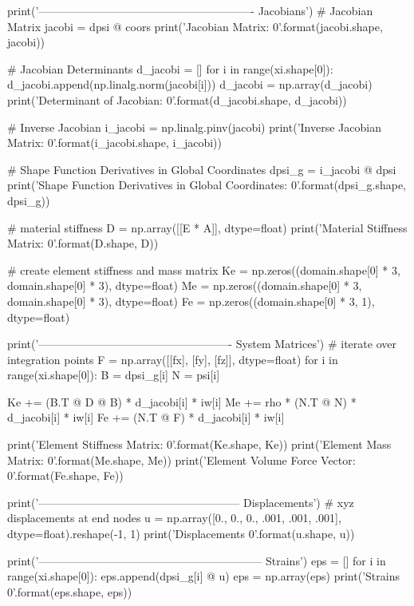 \begin{python}
    print('---------------------------------------------------------- Jacobians')
    # Jacobian Matrix
    jacobi = dpsi @ coors
    print('Jacobian Matrix: {0}\n'.format(jacobi.shape, jacobi))

    # Jacobian Determinants
    d_jacobi = []
    for i in range(xi.shape[0]):
        d_jacobi.append(np.linalg.norm(jacobi[i]))
    d_jacobi = np.array(d_jacobi)
    print('Determinant of Jacobian: {0}\n'.format(d_jacobi.shape, d_jacobi))

    # Inverse Jacobian
    i_jacobi = np.linalg.pinv(jacobi)
    print('Inverse Jacobian Matrix: {0}\n'.format(i_jacobi.shape, i_jacobi))

    # Shape Function Derivatives in Global Coordinates
    dpsi_g = i_jacobi @ dpsi
    print('Shape Function Derivatives in Global Coordinates: {0}\n'.format(dpsi_g.shape, dpsi_g))

    # material stiffness
    D = np.array([[E * A]], dtype=float)
    print('Material Stiffness Matrix: {0}\n'.format(D.shape, D))

    # create element stiffness and mass matrix
    Ke = np.zeros((domain.shape[0] * 3, domain.shape[0] * 3), dtype=float)
    Me = np.zeros((domain.shape[0] * 3, domain.shape[0] * 3), dtype=float)
    Fe = np.zeros((domain.shape[0] * 3, 1), dtype=float)

    print('---------------------------------------------------- System Matrices')
    # iterate over integration points
    F = np.array([[fx], [fy], [fz]], dtype=float)
    for i in range(xi.shape[0]):
        B = dpsi_g[i]
        N = psi[i]

        Ke += (B.T @ D @ B) * d_jacobi[i] * iw[i]
        Me += rho * (N.T @ N) * d_jacobi[i] * iw[i]
        Fe += (N.T @ F) * d_jacobi[i] * iw[i]

    print('Element Stiffness Matrix: {0}\n'.format(Ke.shape, Ke))
    print('Element Mass Matrix: {0}\n'.format(Me.shape, Me))
    print('Element Volume Force Vector: {0}\n'.format(Fe.shape, Fe))

    print('------------------------------------------------------ Displacements')
    # xyz displacements at end nodes
    u = np.array([0.,
                  0.,
                  0.,
                  .001,
                  .001,
                  .001], dtype=float).reshape(-1, 1)
    print('Displacements {0}\n'.format(u.shape, u))

    print('------------------------------------------------------------ Strains')
    eps = []
    for i in range(xi.shape[0]):
        eps.append(dpsi_g[i] @ u)
    eps = np.array(eps)
    print('Strains {0}\n'.format(eps.shape, eps))


\end{python}
